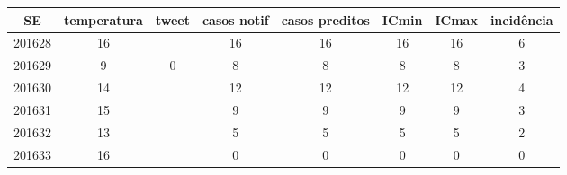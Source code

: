 \begin{tabular}{c|ccccccc}
  \hline
SE & temperatura & tweet & casos notif & casos preditos & ICmin & ICmax & incidência \\ 
  \hline
201628 & 16 &  & 16 & 16 & 16 & 16 & 6 \\ 
  201629 & 9 & 0 & 8 & 8 & 8 & 8 & 3 \\ 
  201630 & 14 &  & 12 & 12 & 12 & 12 & 4 \\ 
  201631 & 15 &  & 9 & 9 & 9 & 9 & 3 \\ 
  201632 & 13 &  & 5 & 5 & 5 & 5 & 2 \\ 
  201633 & 16 &  & 0 & 0 & 0 & 0 & 0 \\ 
   \hline
\end{tabular}
